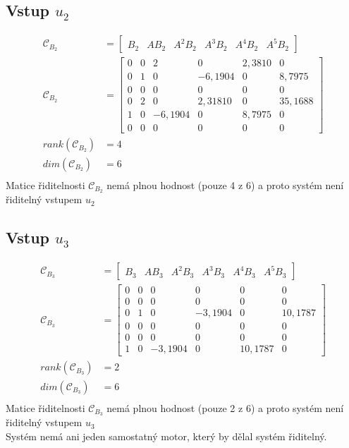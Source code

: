 \documentclass{article}
\newcommand\mat[1]{\begin{bmatrix}#1\end{bmatrix}}
\begin{document}
\subsection{Vstup $u_2$}
\begin{align*}
    \mathcal{C}_{B_2} &= \mat{B_2 & AB_2 & A^2B_2 & A^3B_2 & A^4B_2 & A^5B_2}\\
    \mathcal{C}_{B_2} &= \mat{0 & 0 & 2 & 0 & 2,3810 & 0\\
                   0 & 1 & 0 & -6,1904 & 0 & 8,7975\\
                   0 & 0 & 0 & 0 & 0 & 0\\
                   0 & 2 & 0 & 2,31810 & 0 & 35,1688\\
                   1 & 0 & -6,1904 & 0 & 8,7975 & 0\\
                   0 & 0 & 0 & 0 & 0 & 0}\\
    rank(\mathcal{C}_{B_2}) &= 4\\
    dim(\mathcal{C}_{B_2}) &= 6\\
\end{align*}
Matice řiditelnosti $\mathcal{C}_{B_2}$ nemá plnou hodnost (pouze 4 z 6) a proto systém není řiditelný vstupem $u_2$

\subsection{Vstup $u_3$}
\begin{align*}
    \mathcal{C}_{B_3} &= \mat{B_3 & AB_3 & A^2B_3 & A^3B_3 & A^4B_3 & A^5B_3}\\
    \mathcal{C}_{B_3} &= \mat{0 & 0 & 0 & 0 & 0 & 0\\
                    0 & 0 & 0 & 0 & 0 & 0\\
                    0 & 1 & 0 & -3,1904 & 0 & 10,1787\\
                    0 & 0 & 0 & 0 & 0 & 0\\
                    0 & 0 & 0 & 0 & 0 & 0\\
                    1 & 0 & -3,1904 & 0 & 10,1787 & 0}\\
    rank(\mathcal{C}_{B_3}) &= 2\\
    dim(\mathcal{C}_{B_3}) &= 6\\
\end{align*}
Matice řiditelnosti $\mathcal{C}_{B_3}$ nemá plnou hodnost (pouze 2 z 6) a proto systém není řiditelný vstupem $u_3$\\

Systém nemá ani jeden samostatný motor, který by dělal systém řiditelný.
\end{document}
